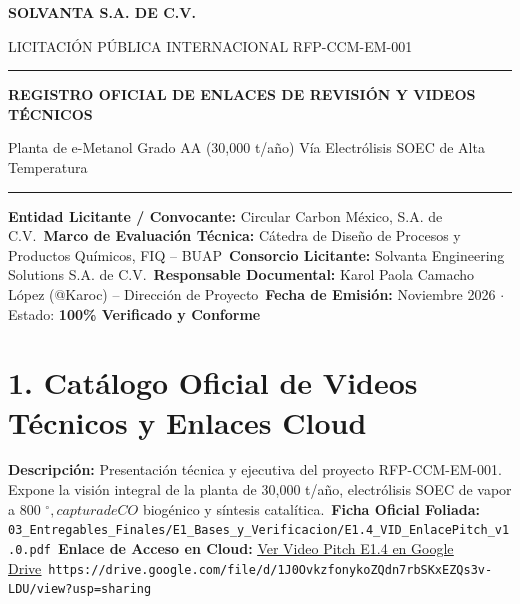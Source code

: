 \documentclass[11pt,letterpaper]{article}
\begin{document}
\begin{center}
    {\Huge\bfseries\color{solvantaBlue} SOLVANTA S.A. DE C.V.\par}
    \vspace{0.2cm}
    {\large\color{gray} LICITACI\'ON P\'UBLICA INTERNACIONAL RFP-CCM-EM-001\par}
    \vspace{0.3cm}
    \rule{\linewidth}{1.5pt}\par
    \vspace{0.4cm}
    {\LARGE\bfseries REGISTRO OFICIAL DE ENLACES DE REVISI\'ON Y VIDEOS T\'ECNICOS\par}
    \vspace{0.2cm}
    {\large Planta de e-Metanol Grado AA (30,000 t/a\~no) V\'ia Electr\'olisis SOEC de Alta Temperatura\par}
    \vspace{0.3cm}
    \rule{\linewidth}{1.5pt}\par
    \vspace{0.5cm}
\end{center}

\begin{tcolorbox}[colframe=solvantaBlue,colback=boxbg,arc=2mm,title=\textbf{Informaci\'on General del Control de Enlaces}]
    \textbf{Entidad Licitante / Convocante:} Circular Carbon M\'exico, S.A. de C.V.\
    \textbf{Marco de Evaluaci\'on T\'ecnica:} C\'atedra de Dise\~no de Procesos y Productos Qu\'imicos, FIQ -- BUAP\
    \textbf{Consorcio Licitante:} Solvanta Engineering Solutions S.A. de C.V.\
    \textbf{Responsable Documental:} Karol Paola Camacho L\'opez (@Karoc) -- Direcci\'on de Proyecto\
    \textbf{Fecha de Emisi\'on:} Noviembre 2026 $\cdot$ Estado: \textbf{100\% Verificado y Conforme}
\end{tcolorbox}

\vspace{0.3cm}
\section*{\color{solvantaBlue}1. Cat\'alogo Oficial de Videos T\'ecnicos y Enlaces Cloud}

\begin{tcolorbox}[colframe=solvantaAccent,colback=white,arc=1.5mm,title=\textbf{Video 01 $\cdot$ Entregable E1.4: Video Pitch Oficial del Proyecto (Fase E1 / RT-01)}]
    \textbf{Descripci\'on:} Presentaci\'on t\'ecnica y ejecutiva del proyecto RFP-CCM-EM-001. Expone la visi\'on integral de la planta de 30,000 t/a\~no, electr\'olisis SOEC de vapor a 800 $^\circ, captura de CO$ biog\'enico y s\'intesis catal\'itica.\
    \textbf{Ficha Oficial Foliada:} \texttt{03\_Entregables\_Finales/E1\_Bases\_y\_Verificacion/E1.4\_VID\_EnlacePitch\_v1.0.pdf}\
    \textbf{Enlace de Acceso en Cloud:} \href{https://drive.google.com/file/d/1J0OvkzfonykoZQdn7rbSKxEZQs3v-LDU/view?usp=sharing}{\color{solvantaAccent}\underline{Ver Video Pitch E1.4 en Google Drive}}\
    \small\texttt{https://drive.google.com/file/d/1J0OvkzfonykoZQdn7rbSKxEZQs3v-LDU/view?usp=sharing}
\end{tcolorbox}
\end{document}
